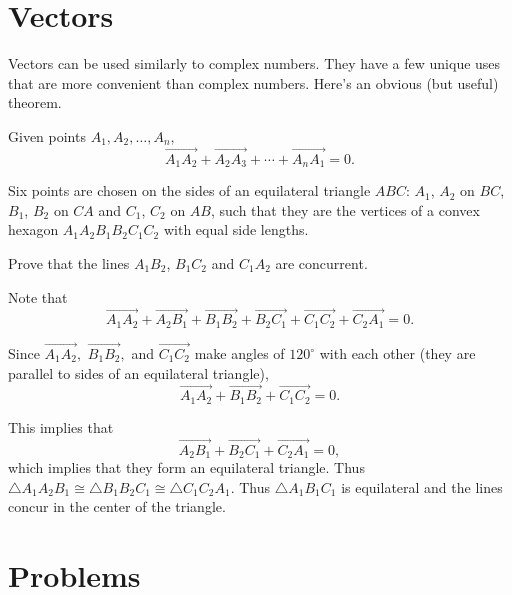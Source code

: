 \documentclass{article}
\begin{document}
\section{Vectors}
Vectors can be used similarly to complex numbers. They have a few unique uses that are more convenient than complex numbers. Here's an obvious (but useful) theorem.

\begin{theo}[Polygon]
Given points $A_1,A_2,\ldots,A_n,$
\[\overrightarrow{A_1A_2}+\overrightarrow{A_2A_3}+\cdots+\overrightarrow{A_nA_1}=0.\]
\end{theo}

\begin{exam}[IMO 2005/1]
Six points are chosen on the sides of an equilateral triangle $ABC$: $A_1$, $A_2$ on $BC$, $B_1$, $B_2$ on $CA$ and $C_1$, $C_2$ on $AB$, such that they are the vertices of a convex hexagon $A_1A_2B_1B_2C_1C_2$ with equal side lengths.

Prove that the lines $A_1B_2$, $B_1C_2$ and $C_1A_2$ are concurrent.
\end{exam}

\begin{sol}
Note that $$\overrightarrow{A_1A_2}+\overrightarrow{A_2B_1}+\overrightarrow{B_1B_2}+\overrightarrow{B_2C_1}+\overrightarrow{C_1C_2}+\overrightarrow{C_2A_1}=0.$$

Since $\overrightarrow{A_1A_2},$ $\overrightarrow{B_1B_2},$ and $\overrightarrow{C_1C_2}$ make angles of $120^{\circ}$ with each other (they are parallel to sides of an equilateral triangle), $$\overrightarrow{A_1A_2}+\overrightarrow{B_1B_2}+\overrightarrow{C_1C_2}=0.$$

This implies that $$\overrightarrow{A_2B_1}+\overrightarrow{B_2C_1}+\overrightarrow{C_2A_1}=0,$$ which implies that they form an equilateral triangle. Thus $\triangle A_1A_2B_1 \cong \triangle B_1B_2C_1 \cong \triangle C_1C_2A_1.$ Thus $\triangle A_1B_1C_1$ is equilateral and the lines concur in the center of the triangle.
\end{sol}

\pagebreak

\section{Problems}


\end{document}
